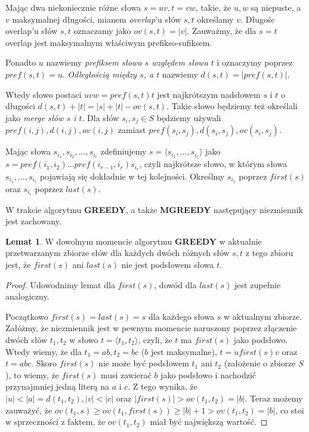 \documentclass[12pt]{article}
\theoremstyle{definition}
\newtheorem{lemma}{Lemat}
\begin{document}
Mając dwa niekoniecznie różne słowa $s = uv, t = vw$, takie, że $u,w$ są niepuste, a $v$ maksymalnej długości, mianem \textit{overlap}'u słów $s,t$ określamy $v$.
Długośc overlap'u słów $s,t$ oznaczamy jako $ov(s,t) = |v|$. Zauważmy, że dla $s=t$ overlap jest maksymalnym właściwym prefikso-sufiksem. 

Ponadto $u$ nazwiemy \textit{prefiksem słowa $s$ względem słowa $t$} i oznaczymy poprzez \linebreak $pref(s,t) = u$. \textit{Odległością między $s$, a $t$} nazwiemy $d(s,t)=|pref(s,t)|$.

Wtedy słowo postaci $uvw = pref(s,t)t$ jest najkrótszym nadsłowem $s$ i $t$ o długości $d(s,t) + |t| = |s| + |t| - ov(s,t)$. Takie słowo będziemy też określali jako
\textit{merge słów $s$ i $t$}. 
Dla słów $s_i, s_j \in S$ będziemy używali 
$pref(i,j), d(i, j), ov(i, j)$ zamiast \linebreak
$pref(s_i,s_j), d(s_i,s_j), ov(s_i, s_j)$.

Mając słowa $s_{i_1}, s_{i_2},...,s_{i_r}$ zdefiniujemy $s = \langle s_{i_1},...,s_{i_r}\rangle$ jako \\ $s = pref(i_1,i_2)...pref(i_{r-1}, i_r)s_{i_r}$, czyli najkrótsze słowo, w którym słowa
$s_{i_1},...,s_{i_r}$ pojawiają się dokładnie w tej kolejności.
Określmy $s_{i_1}$ poprzez $first(s)$ oraz $s_{i_r}$ poprzez $last(s)$.

W trakcie algorytmu \textbf{GREEDY}, a także \textbf{MGREEDY} następujący niezmiennik jest zachowany.

\begin{lemma}
  
W dowolnym momencie algorytmu \textbf{GREEDY} w aktualnie przetwarzanym zbiorze słów dla każdych dwóch różnych słów $s,t$ z tego zbioru jest, że 
$first(s)$ ani $last(s)$ nie jest podsłowem słowa $t$.

\end{lemma}

\begin{proof}
Udowodnimy lemat dla $first(s)$, dowód dla $last(s)$ jest zupełnie analogiczny.

Początkowo $first(s)=last(s)=s$ dla każdego słowa $s$ w aktualnym zbiorze. Załóżmy, że niezmiennik jest w pewnym momencie naruszony poprzez złączenie dwóch słów 
$t_1,t_2$ w słowo $t = \langle t_1,t_2\rangle$, czyli, że $t$ ma $first(s)$ jako podsłowo. Wtedy wiemy, że dla $t_1 = ab, t_2 = bc$ ($b$ jest maksymalne), 
$t = ufirst(s)v$ oraz $t = abc$. Skoro $first(s)$ nie może być podsłowem $t_1$ ani $t_2$ (założenie o zbiorze $S$), to wiemy, że $first(s)$ musi zawierać $b$ jako podsłowo 
i nachodzić przynajmniej jedną literą na $a$ i $c$. Z tego wynika, że $|u| < |a| = d(t_1,t_2), |v| < |c|$ oraz $|first(s)| > ov(t_1, t_2) = |b|$. Teraz możemy zauważyć, że $ov(t_1, s) \geq ov(t_1, first(s)) \geq |b| + 1 > ov(t_1, t_2) = |b|$, co stoi w sprzeczności z faktem, że $ov(t_1, t_2)$ miał być największą wartość.
\end{proof}
\end{document}
